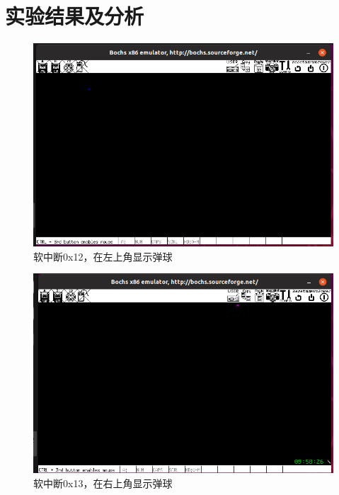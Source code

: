 \documentclass[a4paper,11pt,UTF8]{ctexart}
\newcommand{\bottomcaption}{%
\setlength{\abovecaptionskip}{6pt}%
\setlength{\belowcaptionskip}{6pt}%
\caption}
\begin{document}
\section{实验结果及分析}
	\begin{figure}[htbp]
		\centering
		\includegraphics[width=15cm]{expr_image/1.png}
		\bottomcaption{软中断0x12，在左上角显示弹球}
	\end{figure}
	\begin{figure}[htbp]
		\centering
		\includegraphics[width=15cm]{expr_image/2.png}
		\bottomcaption{软中断0x13，在右上角显示弹球}
	\end{figure}
\end{document}
